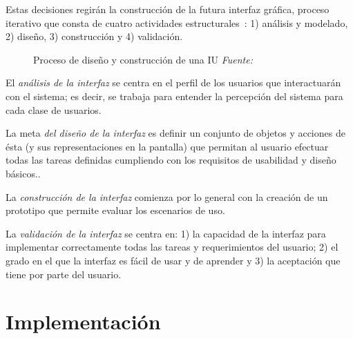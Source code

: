 Estas decisiones regirán la construcción de la futura interfaz gráfica, proceso iterativo que consta de cuatro actividades estructurales~\cite{Man97}: 1) análisis y modelado, 2) diseño, 3) construcción y 4) validación.

\begin{figure} [!htb]
	\centering
	\caption{Proceso de diseño y construcción de una IU \textit{Fuente:~\cite{Pre10}}}
	\label{fig:disenoIU}
\end{figure}

El \emph{análisis de la interfaz} se centra en el perfil de los usuarios que interactuarán con el sistema; es decir, se trabaja para entender la percepción del sistema para cada clase de usuarios.

La meta \emph{del diseño de la interfaz} es definir un conjunto de objetos y acciones de ésta (y sus
representaciones en la pantalla) que permitan al usuario efectuar todas las tareas definidas cumpliendo con los requisitos de usabilidad y diseño básicos..

La \emph{construcción de la interfaz} comienza por lo general con la creación de un prototipo que
permite evaluar los escenarios de uso.

La \emph{validación de la interfaz} se centra en: 1) la capacidad de la interfaz para implementar
correctamente todas las tareas y requerimientos del usuario; 2) el grado en el que la interfaz es fácil de usar y de aprender y 3) la aceptación que tiene por parte del usuario.



\section{Implementación}
\label{sec:secModeloImp}

